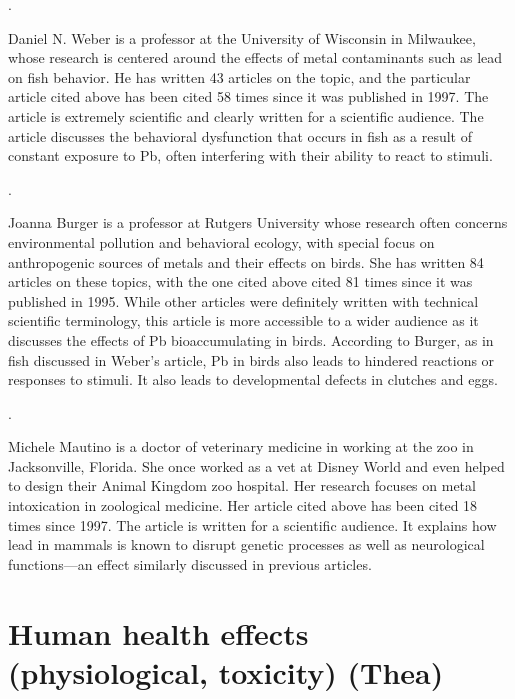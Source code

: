 \documentclass{article}
\begin{document}
\bigskip 

.
\bigskip

Daniel N. Weber is a professor at the University of Wisconsin in Milwaukee, whose research is centered around the effects of metal contaminants such as lead on fish behavior. He has written 43 articles on the topic, and the particular article cited above has been cited 58 times since it was published in 1997. The article is extremely scientific and clearly written for a scientific audience. The article discusses the behavioral dysfunction that occurs in fish as a result of constant exposure to Pb, often interfering with their ability to react to stimuli. 

\bigskip 

.

Joanna Burger is a professor at Rutgers University whose research often concerns environmental pollution and behavioral ecology, with special focus on anthropogenic sources of metals and their effects on birds. She has written 84 articles on these topics, with the one cited above cited 81 times since it was published in 1995. While other articles were definitely written with technical scientific terminology, this article is more accessible to a wider audience as it discusses the effects of Pb bioaccumulating in birds. According to Burger, as in fish discussed in Weber's article, Pb in birds also leads to hindered reactions or responses to stimuli. It also leads to developmental defects in clutches and eggs. 

\bigskip

.

\bigskip

Michele Mautino is a doctor of veterinary medicine in working at the zoo in Jacksonville, Florida. She once worked as a vet at Disney World and even helped to design their Animal Kingdom zoo hospital. Her research focuses on metal intoxication in zoological medicine. Her article cited above has been cited 18 times since 1997. The article is written for a scientific audience. It explains how lead in mammals is known to disrupt genetic processes as well as neurological functions—an effect similarly discussed in previous articles.

\section{Human health effects (physiological, toxicity) (Thea)}
\end{document}
